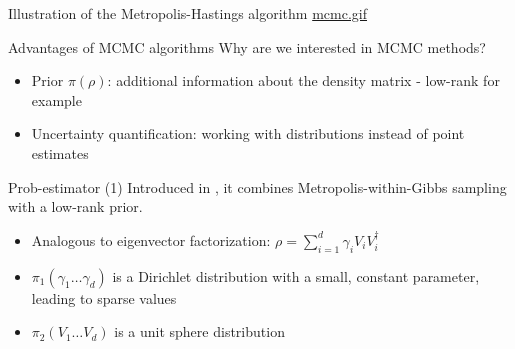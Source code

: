 \documentclass{beamer}
\begin{document}
\begin{frame}{Illustration of the Metropolis-Hastings algorithm}
    \href{run:./mcmc.gif}{mcmc.gif}

\end{frame}

\begin{frame}{Advantages of MCMC algorithms}
    Why are we interested in MCMC methods?
    \begin{itemize}
        \item Prior $\pi(\rho)$: additional information about the density matrix - low-rank for example
        \item Uncertainty quantification: working with distributions instead of point estimates
    \end{itemize} 
\end{frame}

\begin{frame}{Prob-estimator (1)}
    Introduced in \cite{MA17}, it combines Metropolis-within-Gibbs sampling with a low-rank prior.
    \begin{itemize}
        \item Analogous to eigenvector factorization: $\rho = \sum_{i=1}^{d} \gamma_i V_i V_i^\dagger$
        \item $\pi_1(\gamma_1 \dots \gamma_d)$ is a Dirichlet distribution with a small, constant parameter, leading to sparse values 
        \item $\pi_2(V_1 \dots V_d)$ is a unit sphere distribution
    \end{itemize}
\end{frame}
\end{document}
